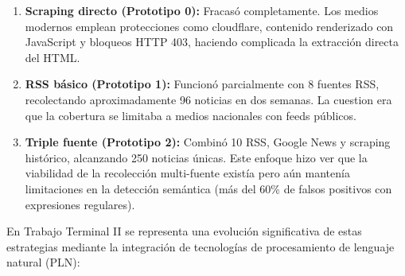 \begin{enumerate}
    \item \textbf{Scraping directo (Prototipo 0):} Fracasó completamente. Los medios modernos emplean protecciones como
    cloudflare, contenido renderizado con JavaScript y bloqueos HTTP 403, haciendo complicada la extracción directa del HTML.
    
    \item \textbf{RSS básico (Prototipo 1):} Funcionó parcialmente con 8 fuentes RSS, recolectando aproximadamente 96 noticias
    en dos semanas. La cuestion era que la cobertura se limitaba a medios nacionales con feeds públicos.
    
    \item \textbf{Triple fuente (Prototipo 2):} Combinó 10 RSS, Google News y scraping histórico, alcanzando 250 noticias únicas.
    Este enfoque hizo ver que la viabilidad de la recolección multi-fuente existía pero aún mantenía limitaciones en la detección
    semántica (más del 60\% de falsos positivos con expresiones regulares).
\end{enumerate} 

En Trabajo Terminal II se representa una evolución significativa de estas estrategias mediante la integración de tecnologías de
procesamiento de lenguaje natural (PLN):

